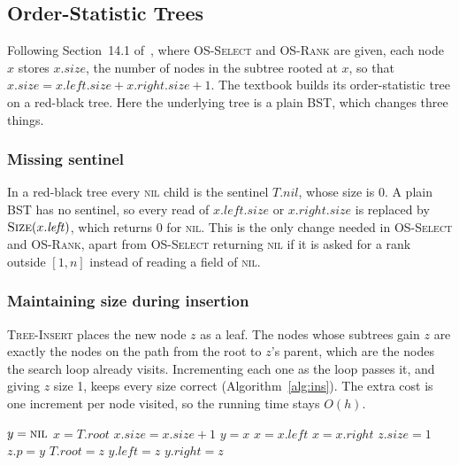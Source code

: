 \documentclass[conference]{IEEEtran}
\newcommand{\INS}{\textsc{Tree-Insert}}
\newcommand{\SEL}{\textsc{OS-Select}}
\newcommand{\RANK}{\textsc{OS-Rank}}
\newcommand{\NIL}{\textsc{nil}}
\newcommand{\new}{\textcolor{blue!60!black}{$\blacktriangleleft$ new}}
\begin{document}
\subsection{Order-Statistic Trees}

Following Section~14.1 of~\cite{clrs}, where \SEL{} and \RANK{} are given, each node $x$ stores
$x.\mathit{size}$, the number of nodes in the subtree rooted at $x$, so that
$x.\mathit{size} = x.\mathit{left}.\mathit{size} + x.\mathit{right}.\mathit{size} + 1$.
The textbook builds its order-statistic tree on a red-black tree. Here the
underlying tree is a plain BST, which changes three things.

\subsubsection*{Missing sentinel}
In a red-black tree every \NIL{} child is the sentinel $T.\mathit{nil}$, whose
size is 0. A plain BST has no sentinel, so every read of
$x.\mathit{left}.\mathit{size}$ or $x.\mathit{right}.\mathit{size}$ is replaced
by $\textsc{Size}(x.\mathit{left})$, which returns 0 for \NIL{}. This is the
only change needed in \SEL{} and \RANK{}, apart from \SEL{} returning \NIL{} if
it is asked for a rank outside $[1, n]$ instead of reading a field of \NIL{}.

\subsubsection*{Maintaining size during insertion}
\INS{} places the new node $z$ as a leaf. The nodes whose subtrees gain $z$
are exactly the nodes on the path from the root to $z$'s parent, which are the
nodes the search loop already visits. Incrementing each one as the loop passes
it, and giving $z$ size 1, keeps every size correct
(Algorithm~\ref{alg:ins}). The extra cost is one increment per node visited,
so the running time stays $O(h)$.

\begin{algorithm}[t]
\caption{\INS{}$(T, z)$ with size maintenance}
\label{alg:ins}
\begin{algorithmic}[1]
\State $y = \NIL$
\State $x = T.\mathit{root}$
\While{$x \ne \NIL$}
  \State $x.\mathit{size} = x.\mathit{size} + 1$ \Comment{\new}
  \State $y = x$
   $x = x.\mathit{left}$
  \Else{} $x = x.\mathit{right}$
  \EndIf
\EndWhile
\State $z.\mathit{size} = 1$ \Comment{\new}
\State $z.p = y$
\If{$y == \NIL$} $T.\mathit{root} = z$
 $y.\mathit{left} = z$
\Else{} $y.\mathit{right} = z$
\EndIf
\end{algorithmic}
\end{algorithm}
\end{document}
